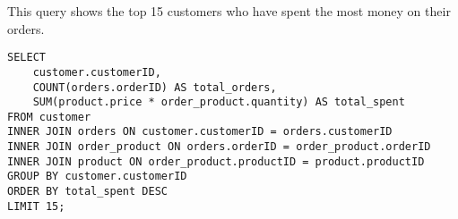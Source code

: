 This query shows the top 15 customers who have spent the most money on their orders.

\begin{lstlisting}
SELECT
    customer.customerID,
    COUNT(orders.orderID) AS total_orders,
    SUM(product.price * order_product.quantity) AS total_spent
FROM customer
INNER JOIN orders ON customer.customerID = orders.customerID
INNER JOIN order_product ON orders.orderID = order_product.orderID
INNER JOIN product ON order_product.productID = product.productID
GROUP BY customer.customerID
ORDER BY total_spent DESC
LIMIT 15;
\end{lstlisting}